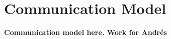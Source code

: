 \section{Communication Model}
\label{sec:Communications_Model}

{\bf Communication model here. Work for Andr{\'{e}}s}

